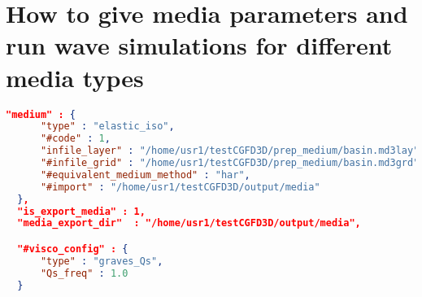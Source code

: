 
\chapter{How to give media parameters and run wave simulations for different media types}\label{chapter-media}


\begin{lstlisting}[language=json, title=par.json, frame=tb]
  "medium" : {
      "type" : "elastic_iso",
      "#code" : 1,
      "infile_layer" : "/home/usr1/testCGFD3D/prep_medium/basin.md3lay",
      "#infile_grid" : "/home/usr1/testCGFD3D/prep_medium/basin.md3grd",
      "#equivalent_medium_method" : "har",
      "#import" : "/home/usr1/testCGFD3D/output/media"
  },
  "is_export_media" : 1,
  "media_export_dir"  : "/home/usr1/testCGFD3D/output/media",

  "#visco_config" : {
      "type" : "graves_Qs",
      "Qs_freq" : 1.0
  }
\end{lstlisting}

